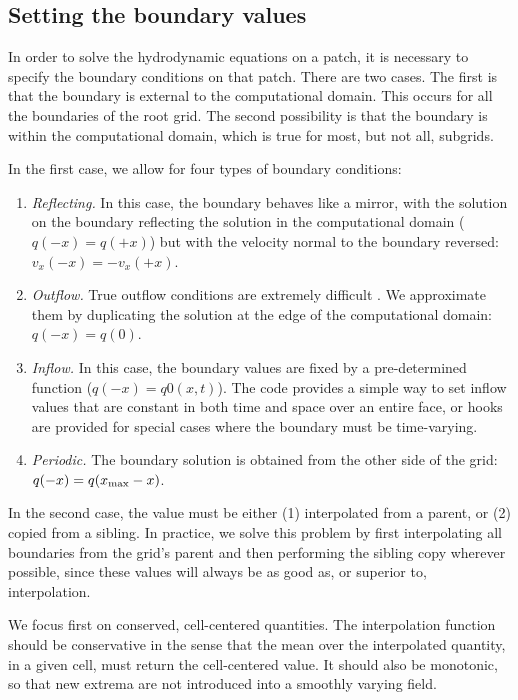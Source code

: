 \subsection{Setting the boundary values}
\label{sec:interpolation}

In order to solve the hydrodynamic equations on a patch, it is necessary to specify the boundary conditions on that patch.  There are two cases.  The first is that the boundary is external to the computational domain.  This occurs for all the boundaries of the root grid.  The second possibility is that the boundary is within the computational domain, which is true for most, but not all, subgrids.

In the first case, we allow for four types of boundary conditions:
\begin{enumerate}
  \item{\em Reflecting.} In this case, the boundary behaves like a mirror, with the solution on the boundary reflecting the solution in the computational domain ($q(-x) = q(+x)$) but with the velocity normal to the boundary reversed: $v_x(-x) = -v_x(+x)$.
  \item{\em Outflow.} True outflow conditions are extremely difficult .  We approximate them by duplicating the solution at the edge of the computational domain: $q(-x) = q(0)$.
  \item{\em Inflow.} In this case, the boundary values are fixed by a pre-determined function ($q(-x) = q0(x,t)$).  The code provides a simple way to set inflow values that are constant in both time and space over an entire face, or hooks are provided for special cases where the boundary must be time-varying.
  \item{\em Periodic.} The boundary solution is obtained from the other side of the grid: $q(-x) = q(x_{\rm{max}}-x)$.
\end{enumerate}

In the second case, the value must be either (1) interpolated from a parent, or (2) copied from a sibling.  In practice, we solve this problem by first interpolating all boundaries from the grid's parent and then performing the sibling copy wherever possible, since these values will always be as good as, or superior to, interpolation.

We focus first on conserved, cell-centered quantities.  The interpolation function should be conservative in the sense that the mean over the interpolated quantity, in a given cell, must return the cell-centered value.  It should also be monotonic, so that new extrema are not introduced into a smoothly varying field.

